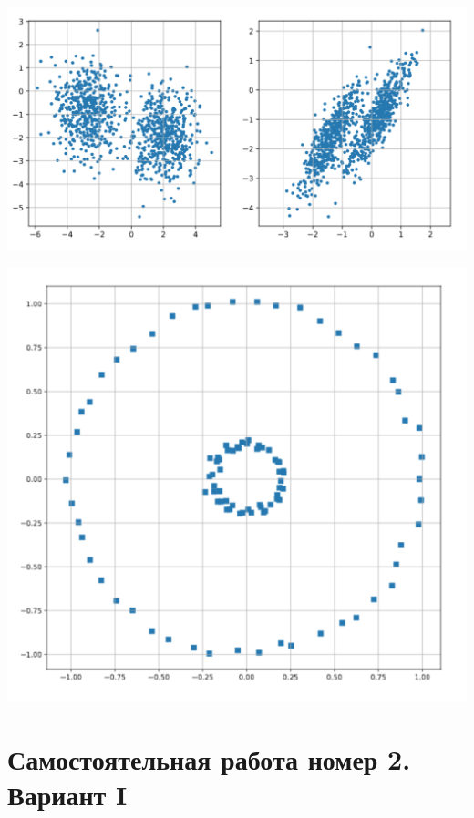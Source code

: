 \documentclass[12pt, a4paper, oneside]{article}
\begin{document}
\begin{minipage}[t]{0.66\textwidth}
\begin{center}
	\includegraphics[scale=0.15]{clouds.png}
\end{center}
\end{minipage}
\begin{minipage}[t]{0.33\textwidth}
\begin{center}
	\includegraphics[scale=0.13]{circles.png}
\end{center}
\end{minipage}


\newpage 


\section*{Самостоятельная работа номер 2. Вариант I}
\end{document}
